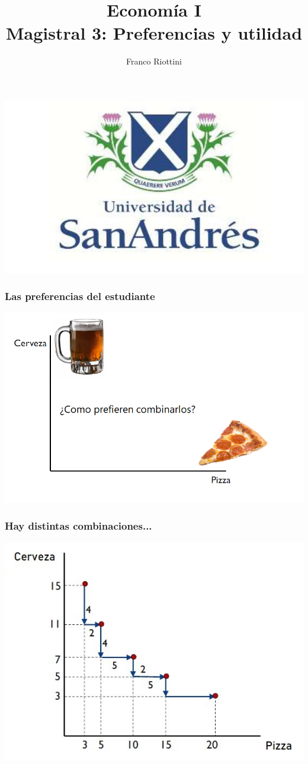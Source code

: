 \documentclass{beamer}
\title[Economía I]{Economía I \vspace{4mm}
\\ Magistral 3: Preferencias y utilidad}
\date{}
\author[Riottini]{Franco Riottini}
\institute[]{Universidad de San Andrés}
\begin{document}
\begin{frame}
\titlepage
\centering
\includegraphics[scale=0.2]{../Figures/logoUDESA.jpg} 
\end{frame}

\begin{frame}
\frametitle{Las preferencias del estudiante}
\centering
\includegraphics[scale=0.55]{../Figures/Tema_02.11_rp9.png}
\end{frame}

\begin{frame}
\frametitle{Hay distintas combinaciones...}
\centering
\includegraphics[scale=0.60]{../Figures/Tema_02.12_rp10.jpg}
\end{frame}
\end{document}
